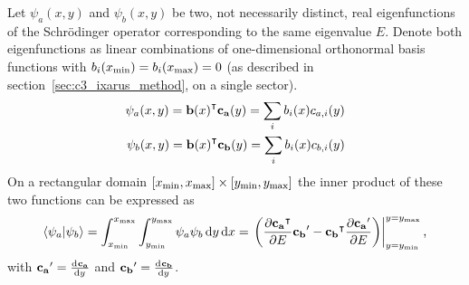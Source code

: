 \begin{theorem}\label{the:c3_dot_product}
  Let $\psi_a(x, y)$ and $\psi_b(x, y)$ be two, not necessarily distinct, real eigenfunctions of the Schrödinger operator corresponding to the same eigenvalue $E$. Denote both eigenfunctions as linear combinations of one-dimensional orthonormal basis functions with $b_i({x_{\text{min}}}) = b_i({x_{\text{max}}}) = 0$ (as described in section~\ref{sec:c3_ixarus_method}, on a single sector).
  \begin{align*}
    \psi_a(x, y) = {\vb{b}(x)}^\intercal \vb{c_a}(y) = \sum_i b_i(x) c_{a, i}(y) \\
    \psi_b(x, y) = {\vb{b}(x)}^\intercal \vb{c_b}(y) = \sum_i b_i(x) c_{b, i}(y)
  \end{align*}
  On a rectangular domain $[{x_{\text{min}}}, {x_{\text{max}}}] \times [{y_{\text{min}}}, {y_{\text{max}}}]$ the inner product of these two functions can be expressed as
  $$
    \bra{\psi_a}\ket{\psi_b} = \int_{x_{\text{min}}}^{x_{\text{max}}} \int_{y_{\text{min}}}^{y_{\text{max}}} \psi_a\psi_b \, \dd y \, \dd x = \left. \left(\pdv{{\vb{c_a}}^\intercal}{E} \vb{c_b}' - {\vb{c_b}}^\intercal\pdv{\vb{c_a}'}{E} \right) \right|_{y={y_{\text{min}}}}^{y={y_{\text{max}}}} \text{,}
  $$
  with $\vb{c_a}' = \dv[]{\vb{c_a}}{y}$ and $\vb{c_b}' = \dv[]{\vb{c_b}}{y}$.
\end{theorem}
